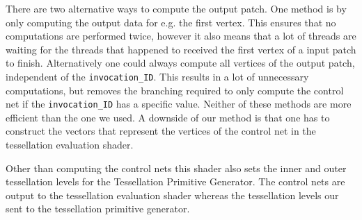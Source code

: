		There are two alternative ways to compute the output patch. One method is by only computing the output data for e.g. the first vertex. This ensures that no computations are performed twice, however it also means that a lot of threads are waiting for the threads that happened to received the first vertex of a input patch to finish.  
		Alternatively one could always compute all vertices of the output patch, independent of the \texttt{invocation\_ID}. This results in a lot of unnecessary computations, but removes the branching required to only compute the control net if the \texttt{invocation\_ID} has a specific value. Neither of these methods are more efficient than the one we used. A downside of our method is that one has to construct the vectors that represent the vertices of the control net in the tessellation evaluation shader. 

		Other than computing the control nets this shader also sets the inner and outer tessellation levels for the Tessellation Primitive Generator. 
	The control nets are output to the tessellation evaluation shader whereas the tessellation levels our sent to the tessellation primitive generator. 

